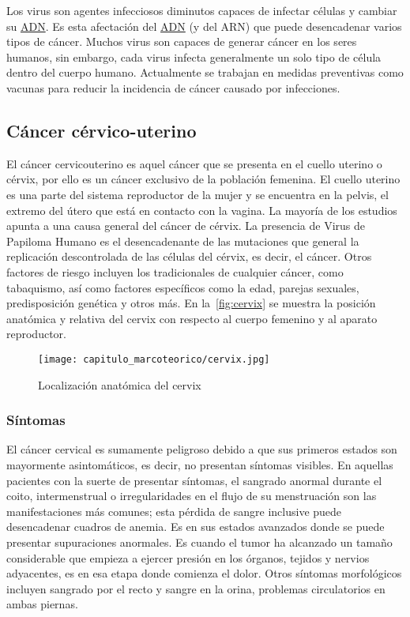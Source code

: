 Los virus son agentes infecciosos diminutos capaces de infectar células y
cambiar su \hyperlink{abbr}{ADN}. Es esta afectación del \hyperlink{abbr}{ADN}
(y del ARN) que puede desencadenar varios tipos de cáncer. Muchos virus son
capaces de generar cáncer en los seres humanos, sin embargo, cada virus infecta
generalmente un solo tipo de célula dentro del cuerpo humano. Actualmente se
trabajan en medidas preventivas como vacunas para reducir la incidencia de
cáncer causado por infecciones. 

\subsection{Cáncer cérvico-uterino}

El cáncer cervicouterino  es aquel cáncer que se
presenta en el cuello uterino o cérvix, por ello es un cáncer exclusivo de la
población femenina. El cuello uterino es una parte del sistema reproductor de la
mujer y se encuentra en la pelvis, el extremo del útero que está en contacto con
la vagina. La mayoría de los estudios apunta a una causa general del cáncer de
cérvix. La presencia de Virus de Papiloma Humano es el desencadenante de las
mutaciones que general la replicación descontrolada de las células del cérvix,
es decir, el cáncer. Otros factores de riesgo incluyen los tradicionales de
cualquier cáncer, como tabaquismo, así como factores específicos como la edad,
parejas sexuales, predisposición genética y otros más. En
la~\autoref{fig:cervix} se muestra la posición anatómica y relativa del cervix
con respecto al cuerpo femenino y al aparato reproductor.

\begin{figure}[H]
    \centering
    \texttt{[image: capitulo\_marcoteorico/cervix.jpg]}
    \caption{Localización anatómica del cervix}
    \label{fig:cervix}
\end{figure}


\subsubsection{Síntomas}
El cáncer cervical es sumamente peligroso debido a que sus primeros estados son mayormente
asintomáticos, es decir, no presentan síntomas visibles. En aquellas pacientes con la suerte
de presentar síntomas, el sangrado anormal durante el coito, intermenstrual o irregularidades
en el flujo de su menstruación son las manifestaciones más comunes; esta pérdida de sangre
inclusive puede desencadenar cuadros de anemia. Es en sus estados avanzados donde se puede
presentar supuraciones anormales. Es cuando el tumor ha alcanzado un tamaño considerable
que empieza a ejercer presión en los órganos, tejidos y nervios  adyacentes, es en esa etapa
donde comienza el dolor. Otros síntomas morfológicos incluyen sangrado por el recto y sangre en la orina, problemas
circulatorios en ambas piernas. 

